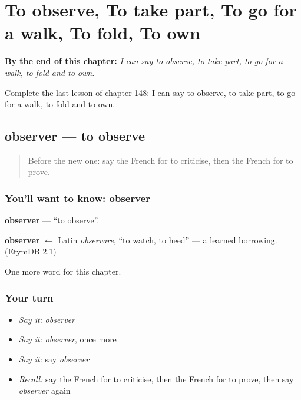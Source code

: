 
\chapter{To observe, To take part, To go for a walk, To fold, To own}
\label{ch:fr-to-observe-to-take-part-to-go-for-a-walk-to-fold-to-own}

\begin{chapteropening}
\textbf{By the end of this chapter:} \emph{I can say to observe, to take part, to go for a walk, to fold and to own.}

Complete the last lesson of chapter 148: I can say to observe, to take part, to go for a walk, to fold and to own.
\end{chapteropening}

\section[observer]{observer — to observe}

\label{lesson:FR-C148-observer}



\begin{quote}
Before the new one: say the French for to criticise, then the French for to prove.
\end{quote}

\subsection*{You'll want to know: observer}
\textbf{observer} — \textquotedblleft{}to observe\textquotedblright{}.

\begin{cousinweb}
\textbf{observer} $\leftarrow$ Latin \emph{observare}, \textquotedblleft{}to watch, to heed\textquotedblright{} — a learned borrowing. (EtymDB 2.1)
\end{cousinweb}

\begin{grammarlens}[title={What you've built}]
One more word for this chapter.
\end{grammarlens}

\subsection*{Your turn}
\begin{itemize}
\raggedright
  \item \emph{Say it:} \emph{observer}
  \item \emph{Say it:} \emph{observer}, once more
  \item \emph{Say it:} say \emph{observer}
  \item \emph{Recall:} say the French for to criticise, then the French for to prove, then say \emph{observer} again
\end{itemize}


